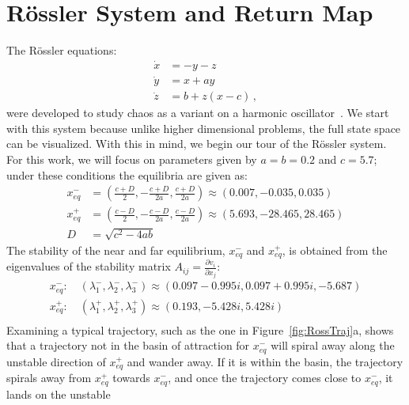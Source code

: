 \documentclass[12 pt]{article}
\begin{document}
\section{R\"ossler System and Return Map}
\label{sec:Ross}
The R\"ossler equations:
\begin{equation}
\begin{split}
  \dot x &= -y -z \\
  \dot y &= x + a y \\
  \dot z &= b + z (x - c) \,,
  \label{eq:Rossler}
\end{split}
\end{equation}
were developed to study chaos as a variant on a harmonic
oscillator~\cite{CB}.  We start with this system because unlike higher
dimensional problems, the full state space can be visualized.  With this
in mind, we begin our tour of the R\"ossler system.
For this work, we will focus on parameters given by $a = b = 0.2$ and $c
= 5.7$; under these conditions the equilibria are given as:
\begin{equation}
\begin{split}
x_{eq}^{-} &= (\frac{c+D}{2}, -\frac{c+D}{2a}, \frac{c+D}{2a}) \approx (0.007,-0.035,0.035)\\
x_{eq}^{+} &= (\frac{c-D}{2}, -\frac{c-D}{2a}, \frac{c-D}{2a}) \approx (5.693,-28.465,28.465) \\
D &= \sqrt{c^2-4ab}
\end{split}
\label{eq:RossEq}
\end{equation}
The stability of the near and far equilibrium, $x_{eq}^{-}$ and
$x_{eq}^{+}$, is obtained from the eigenvalues of the stability matrix
$A_{ij} = \frac{\partial{v_{i}}}{\partial{x_{j}}}$:
\begin{equation}
\begin{split}
x_{eq}^{-} : \quad (\lambda_1^-, \lambda_2^-, \lambda_3^-) \approx (0.097-0.995i, 0.097+0.995i, -5.687) \\
x_{eq}^{+} : \quad (\lambda_1^+, \lambda_2^+, \lambda_3^+) \approx (0.193, -5.428i, 5.428i) \\
\end{split}
\label{eq:RossStab}
\end{equation}
Examining a typical trajectory, such as the one in
Figure~\ref{fig:RossTraj}a, shows that a trajectory not in the basin of
attraction for $x_{eq}^{-}$ will spiral away along the unstable direction
of $x_{eq}^{+}$ and wander away.  If it is within the basin, the
trajectory spirals away from $x_{eq}^{+}$ towards $x_{eq}^{-}$, and once
the trajectory comes close to $x_{eq}^{-}$, it lands on the unstable
\end{document}
